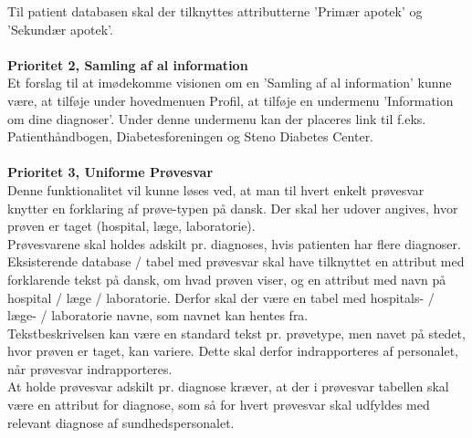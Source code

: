  Til patient databasen skal der tilknyttes attributterne 'Primær apotek' og 'Sekundær apotek'.
 \\\\
 \textbf{Prioritet 2, Samling af al information} \\
 Et forslag til at imødekomme visionen om en 'Samling af al information' kunne være, at tilføje under hovedmenuen Profil, at tilføje en undermenu 'Information om dine diagnoser'. Under denne undermenu kan der placeres link til f.eks. Patienthåndbogen, Diabetesforeningen og Steno Diabetes Center.
 \\\\ 
 \textbf{Prioritet 3, Uniforme Prøvesvar} \\
 Denne funktionalitet vil kunne løses ved, at man til hvert enkelt prøvesvar knytter en forklaring af prøve-typen på dansk. Der skal her udover angives, hvor prøven er taget (hospital, læge, laboratorie).\\
 Prøvesvarene skal holdes adskilt pr. diagnoses, hvis patienten har flere diagnoser.\\
 Eksisterende database / tabel med prøvesvar skal have tilknyttet en attribut med forklarende tekst på dansk, om hvad prøven viser, og en attribut med navn på hospital / læge / laboratorie. Derfor skal der være en tabel med hospitals- / læge- / laboratorie navne, som navnet kan hentes fra.\\ 
 Tekstbeskrivelsen kan være en standard tekst pr. prøvetype, men navet på stedet, hvor prøven er taget, kan variere. Dette skal derfor indrapporteres af personalet, når prøvesvar indrapporteres. \\
 At holde prøvesvar adskilt pr. diagnose kræver, at der i prøvesvar tabellen skal være en attribut for diagnose, som så for hvert prøvesvar skal udfyldes med relevant diagnose af sundhedspersonalet.\\
